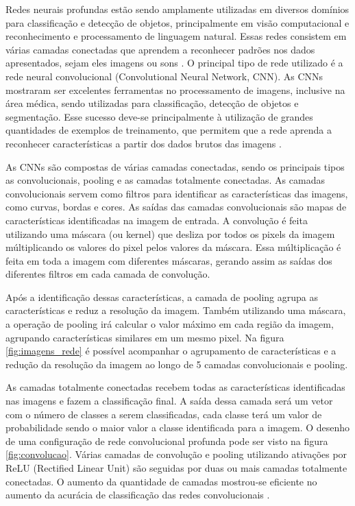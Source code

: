 \documentclass[conference]{IEEEtran}
\begin{document}

Redes neurais profundas estão sendo amplamente utilizadas em diversos domínios para classificação e detecção de objetos, principalmente em visão computacional e reconhecimento e processamento de linguagem natural. Essas redes consistem em várias camadas conectadas que aprendem a reconhecer padrões nos dados apresentados, sejam eles imagens ou sons \cite{LeCun2015}. O principal tipo de rede utilizado é a rede neural convolucional (Convolutional Neural Network, CNN). As CNNs mostraram ser excelentes ferramentas no processamento de imagens, inclusive na área médica, sendo utilizadas para classificação, detecção de objetos e segmentação. Esse sucesso deve-se principalmente à utilização de grandes quantidades de exemplos de treinamento, que permitem que a rede aprenda a reconhecer características a partir dos dados brutos das imagens \cite{greenspan2016}. %

As CNNs são compostas de várias camadas conectadas, sendo os principais tipos as convolucionais, pooling e as camadas totalmente conectadas. As camadas convolucionais servem como filtros para identificar as características das imagens, como curvas, bordas e cores. As saídas das camadas convolucionais são mapas de características identificadas na imagem de entrada. A convolução é feita utilizando uma máscara (ou kernel) que desliza por todos os pixels da imagem múltiplicando os valores do pixel pelos valores da máscara. Essa múltiplicação é feita em toda a imagem com diferentes máscaras, gerando assim as saídas dos diferentes filtros em cada camada de convolução.

Após a identificação dessas características, a camada de pooling agrupa as características e reduz a resolução da imagem. Também utilizando uma máscara, a operação de pooling irá calcular o valor máximo em cada região da imagem, agrupando características similares em um mesmo pixel. Na figura \ref{fig:imagens_rede} é possível acompanhar o agrupamento de características e a redução da resolução da imagem ao longo de 5 camadas convolucionais e pooling.

As camadas totalmente conectadas recebem todas as características identificadas nas imagens e fazem a classificação final. A saída dessa camada será um vetor com o número de classes a serem classificadas, cada classe terá um valor de probabilidade sendo o maior valor a classe identificada para a imagem. O desenho de uma configuração de rede convolucional profunda pode ser visto na figura \ref{fig:convolucao}. Várias camadas de convolução e pooling utilizando ativações por ReLU (Rectified Linear Unit) são seguidas por duas ou mais camadas totalmente conectadas. O aumento da quantidade de camadas mostrou-se eficiente no aumento da acurácia de classificação das redes convolucionais \cite{simonyan2014}.
\end{document}
